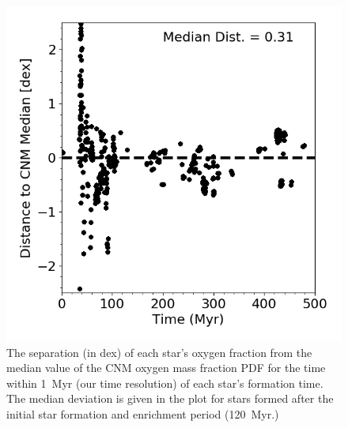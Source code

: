 \documentclass[twocolumn]{aastex61}
\begin{document}
\begin{figure}
\centering
\includegraphics[width=0.95\linewidth]{stellar_CNM_distance.png}
\caption{The separation (in dex) of each star's oxygen fraction from the median value of the CNM oxygen mass fraction PDF for the
    time 
within 1~Myr (our time resolution) of each star's formation time. The median deviation is given in the plot for stars formed after the initial star formation and enrichment period (120~Myr.)}
\label{fig:stars}
\end{figure}

\end{document}
